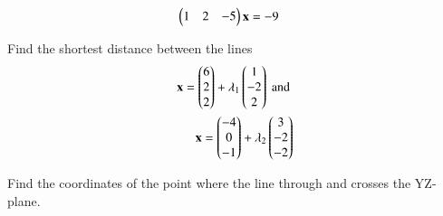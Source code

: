 \begin{align}
\begin{pmatrix}1 & 2 & -5\end{pmatrix}\mathbf{x}&=-9
\end{align}
\solution

\item Find the shortest distance between the lines 
%
\begin{align}
\mathbf{x} = \begin{pmatrix}6 \\ 2 \\ 2\end{pmatrix} + \lambda_1 \begin{pmatrix}1 \\ -2 \\ 2\end{pmatrix}  \text{ and }
\\
\mathbf{x} = \begin{pmatrix}-4 \\ 0 \\ -1\end{pmatrix} + \lambda_2 \begin{pmatrix}3 \\ -2 \\ -2\end{pmatrix}  
\end{align}
%
\item Find the coordinates of the point where the line through  and  crosses the YZ-plane.
\\
\solution


